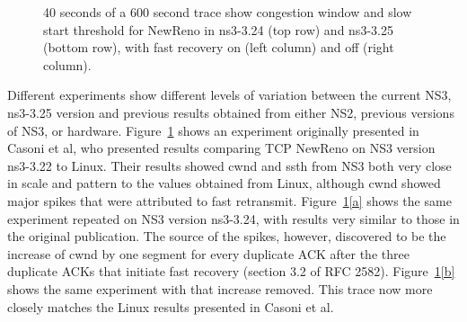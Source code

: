 \documentclass[conference]{IEEEtran}
\begin{document}
\begin{figure}[h!]
\begin{center}
\end{center}
\caption{40 seconds of a 600 second trace show congestion window and slow start threshold for NewReno in ns3-3.24 (top row) and ns3-3.25 (bottom row), with fast recovery on (left column) and off (right column).}
\label{fig:NS3Val}
\end{figure}

Different experiments show different levels of variation between the current NS3, ns3-3.25 version and previous results obtained from either NS2, previous versions of NS3, or hardware. Figure~\ref{fig:NS3Val} shows an experiment originally presented in Casoni et al\cite{NS3Val}, who presented results comparing TCP NewReno on NS3 version ns3-3.22 to Linux. Their results showed cwnd and ssth from NS3 both very close in scale and pattern to the values obtained from Linux, although cwnd showed major spikes that were attributed to fast retransmit. Figure~\ref{fig:NS3Val}\ref{a} shows the same experiment repeated on NS3 version ns3-3.24, with results very similar to those in the original publication. The source of the spikes, however, discovered to be the increase of cwnd by one segment for every duplicate ACK after the three duplicate ACKs that initiate fast recovery (section 3.2 of RFC 2582\cite{RFC2582}). Figure~\ref{fig:NS3Val}\ref{b} shows the same experiment with that increase removed. This trace now more closely matches the Linux results presented in Casoni et al\cite{NS3Val}.
\end{document}
